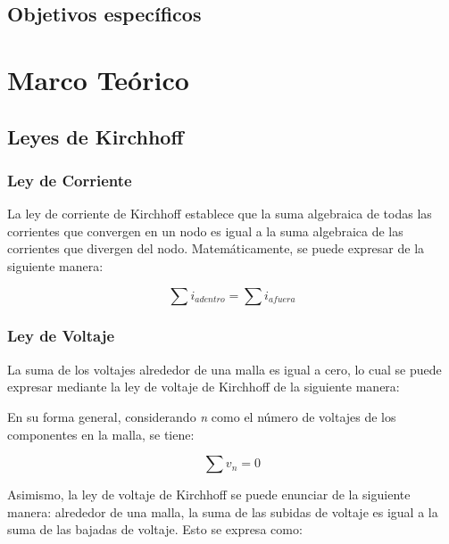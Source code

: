 \documentclass[twocolumn, 12pt]{article}
\begin{document}
\subsection{Objetivos específicos}

\section{Marco Teórico}

\subsection{Leyes de Kirchhoff} \nocite{KhanAcademy__Kirchhoff}

\subsubsection{Ley de Corriente}

La ley de corriente de Kirchhoff establece que la suma
algebraica de todas las corrientes que convergen en un nodo
es igual a la suma algebraica de las corrientes que
divergen del nodo. Matemáticamente, se puede expresar de la
siguiente manera:

{\large
\begin{equation}
    \sum i_{adentro} = \sum i_{afuera}
\end{equation}
}

\subsubsection{Ley de Voltaje}

La suma de los voltajes alrededor de una malla es igual a
cero, lo cual se puede expresar mediante la ley de voltaje
de Kirchhoff de la siguiente manera:

En su forma general, considerando \textit{n} como el número
de voltajes de los componentes en la malla, se tiene:

{\large
\begin{equation}
    \sum v_n = 0
\end{equation}
}

Asimismo, la ley de voltaje de Kirchhoff se puede enunciar
de la siguiente manera: alrededor de una malla, la suma de
las subidas de voltaje es igual a la suma de las bajadas de
voltaje. Esto se expresa como:
\end{document}
